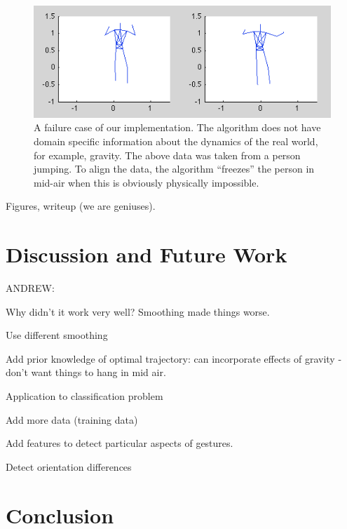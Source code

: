 \documentclass{article}
\begin{document}
\begin{figure}
\begin{centering}
\includegraphics[width=\columnwidth]{figures/jump.png}

\caption{A failure case of our implementation. The algorithm does not have
domain specific information about the dynamics of the real world, for example,
gravity. The above data was taken from a person jumping. To align the data,
the algorithm ``freezes'' the person in mid-air when this is obviously
physically impossible. \label{figure:jump}}

\end{centering}
\end{figure}









Figures, writeup (we are geniuses).

\section{Discussion and Future Work}

ANDREW:

Why didn't it work very well? Smoothing made things worse.

Use different smoothing

Add prior knowledge of optimal trajectory: can incorporate effects of gravity - don't want things to hang in mid air.

Application to classification problem

Add more data (training data)

Add features to detect particular aspects of gestures.

Detect orientation differences

\section{Conclusion}
\end{document}
